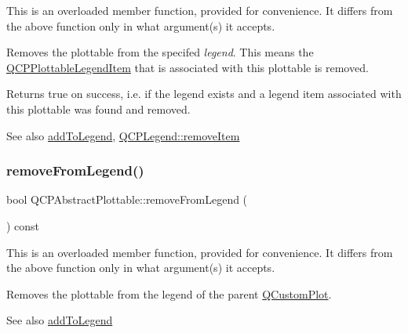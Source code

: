 This is an overloaded member function, provided for convenience. It differs from the above function only in what argument(s) it accepts.

Removes the plottable from the specifed {\itshape legend}. This means the \hyperlink{classQCPPlottableLegendItem}{Q\+C\+P\+Plottable\+Legend\+Item} that is associated with this plottable is removed.

Returns true on success, i.\+e. if the legend exists and a legend item associated with this plottable was found and removed.

\begin{DoxySeeAlso}{See also}
\hyperlink{classQCPAbstractPlottable_aa64e93cb5b606d8110d2cc0a349bb30f}{add\+To\+Legend}, \hyperlink{classQCPLegend_ac91595c3eaa746fe6321d2eb952c63bb}{Q\+C\+P\+Legend\+::remove\+Item} 
\end{DoxySeeAlso}
\mbox{\label{classQCPAbstractPlottable_ac95fb2604d9106d0852ad9ceb326fe8c}} 
\subsubsection{\texorpdfstring{remove\+From\+Legend()}{removeFromLegend()}\hspace{0.1cm}{\footnotesize\ttfamily [2/2]}}
{\footnotesize\ttfamily bool Q\+C\+P\+Abstract\+Plottable\+::remove\+From\+Legend (\begin{DoxyParamCaption}{ }\end{DoxyParamCaption}) const}

This is an overloaded member function, provided for convenience. It differs from the above function only in what argument(s) it accepts.

Removes the plottable from the legend of the parent \hyperlink{classQCustomPlot}{Q\+Custom\+Plot}.

\begin{DoxySeeAlso}{See also}
\hyperlink{classQCPAbstractPlottable_aa64e93cb5b606d8110d2cc0a349bb30f}{add\+To\+Legend} 
\end{DoxySeeAlso}
\mbox{\label{classQCPAbstractPlottable_a1491c4a606bccd2d09e65e11b79eb882}} 
